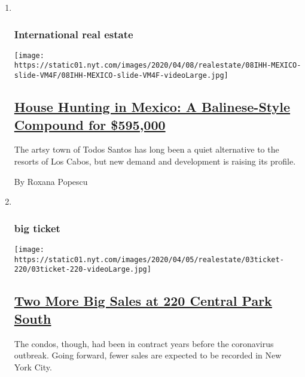 \begin{enumerate}
\def\labelenumi{\arabic{enumi}.}
\item ~
  \hypertarget{international-real-estate-1}{%
  \subsubsection{International real
  estate}\label{international-real-estate-1}}

  \texttt{[image: https://static01.nyt.com/images/2020/04/08/realestate/08IHH-MEXICO-slide-VM4F/08IHH-MEXICO-slide-VM4F-videoLarge.jpg]}

  \hypertarget{house-hunting-in-mexico-a-balinese-style-compound-for-595000-1}{%
  \subsection{\texorpdfstring{\href{/2020/04/08/realestate/house-hunting-in-mexico-a-balinese-style-compound-for-595000.html}{House
  Hunting in Mexico: A Balinese-Style Compound for
  \$595,000}}{House Hunting in Mexico: A Balinese-Style Compound for \$595,000}}\label{house-hunting-in-mexico-a-balinese-style-compound-for-595000-1}}

  The artsy town of Todos Santos has long been a quiet alternative to
  the resorts of Los Cabos, but new demand and development is raising
  its profile.

  By Roxana Popescu
\item ~
  \hypertarget{big-ticket}{%
  \subsubsection{big ticket}\label{big-ticket}}

  \texttt{[image: https://static01.nyt.com/images/2020/04/05/realestate/03ticket-220/03ticket-220-videoLarge.jpg]}

  \hypertarget{two-more-big-sales-at-220-central-park-south}{%
  \subsection{\texorpdfstring{\href{/2020/04/03/realestate/two-more-big-sales-at-220-central-park-south.html}{Two
  More Big Sales at 220 Central Park
  South}}{Two More Big Sales at 220 Central Park South}}\label{two-more-big-sales-at-220-central-park-south}}

  The condos, though, had been in contract years before the coronavirus
  outbreak. Going forward, fewer sales are expected to be recorded in
  New York City.


\end{enumerate}

